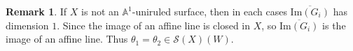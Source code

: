 \documentclass[11pt, reqno]{amsart}
\theoremstyle{plain}
\newtheorem{theorem}[thm]{Theorem}
\theoremstyle{definition}
\newtheorem{remark}[thm]{Remark}
\newcommand{\Spec}{{\rm Spec \,}}
\begin{document}

\begin{remark}
If $X$ is not an $\mathbb{A}^1$-uniruled surface, then in each cases $\overline{\text{Im}(G_i)}$ has dimension $1$. Since the image of an affine line is closed in $X$, so $\overline{\text{Im}(G_i)}$ is the image of an affine line. Thus $\theta_1 = \theta_2 \in \mathcal{S}(X)(W)$.
\end{remark}




\end{document}
